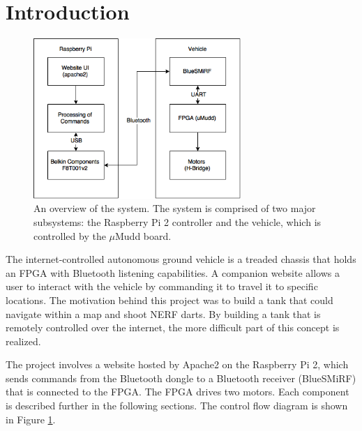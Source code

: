 \documentclass[12pt]{article}
\begin{document}
%

\newpage

\tableofcontents

\newpage


\section{Introduction}

\begin{figure}[b!]
\begin{center}
\includegraphics[width=0.7\textwidth]{E155System}
\end{center}
\caption{An overview of the system. The system is comprised of two major subsystems: the Raspberry Pi 2 controller and the vehicle, which is controlled by the $\mu$Mudd board.}
\label{fig:sys}
\end{figure}

The internet-controlled autonomous ground vehicle is a treaded chassis that holds an FPGA with Bluetooth listening capabilities. A companion website allows a user to interact with the vehicle by commanding it to travel it to specific locations. The motivation behind this project was to build a tank that could navigate within a map and shoot NERF darts. By building a tank that is remotely controlled over the internet, the more difficult part of this concept is realized.

The project involves a website hosted by Apache2 on the Raspberry Pi 2, which sends commands from the Bluetooth dongle to a Bluetooth receiver (BlueSMiRF) that is connected to the FPGA. The FPGA drives two motors. Each component is described further in the following sections. The control flow diagram is shown in Figure \ref{fig:sys}.
\end{document}
